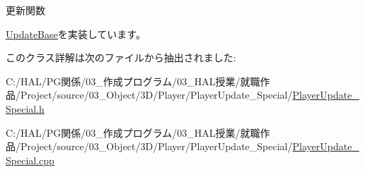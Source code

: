 更新関数 



\mbox{\hyperlink{class_update_base_a9fdc8924001cf6fa89c1f5fa0d867682}{Update\+Base}}を実装しています。



このクラス詳解は次のファイルから抽出されました\+:\begin{DoxyCompactItemize}
\item 
C\+:/\+H\+A\+L/\+P\+G関係/03\+\_\+作成プログラム/03\+\_\+\+H\+A\+L授業/就職作品/\+Project/source/03\+\_\+\+Object/3\+D/\+Player/\+Player\+Update\+\_\+\+Special/\mbox{\hyperlink{_player_update___special_8h}{Player\+Update\+\_\+\+Special.\+h}}\item 
C\+:/\+H\+A\+L/\+P\+G関係/03\+\_\+作成プログラム/03\+\_\+\+H\+A\+L授業/就職作品/\+Project/source/03\+\_\+\+Object/3\+D/\+Player/\+Player\+Update\+\_\+\+Special/\mbox{\hyperlink{_player_update___special_8cpp}{Player\+Update\+\_\+\+Special.\+cpp}}\end{DoxyCompactItemize}
